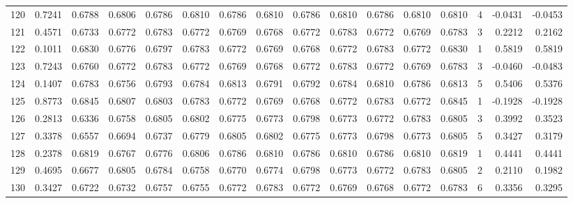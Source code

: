 \begin{tabular}{lrrrrrrrrrrrrrrr}
120 &      0.7241 &  0.6788 &  0.6806 &  0.6786 &  0.6810 &  0.6786 &  0.6810 &  0.6786 &  0.6810 &  0.6786 &   0.6810 &     0.6810 &      4 &                   -0.0431 &                    -0.0453 \\
121 &      0.4571 &  0.6733 &  0.6772 &  0.6783 &  0.6772 &  0.6769 &  0.6768 &  0.6772 &  0.6783 &  0.6772 &   0.6769 &     0.6783 &      3 &                    0.2212 &                     0.2162 \\
122 &      0.1011 &  0.6830 &  0.6776 &  0.6797 &  0.6783 &  0.6772 &  0.6769 &  0.6768 &  0.6772 &  0.6783 &   0.6772 &     0.6830 &      1 &                    0.5819 &                     0.5819 \\
123 &      0.7243 &  0.6760 &  0.6772 &  0.6783 &  0.6772 &  0.6769 &  0.6768 &  0.6772 &  0.6783 &  0.6772 &   0.6769 &     0.6783 &      3 &                   -0.0460 &                    -0.0483 \\
124 &      0.1407 &  0.6783 &  0.6756 &  0.6793 &  0.6784 &  0.6813 &  0.6791 &  0.6792 &  0.6784 &  0.6810 &   0.6786 &     0.6813 &      5 &                    0.5406 &                     0.5376 \\
125 &      0.8773 &  0.6845 &  0.6807 &  0.6803 &  0.6783 &  0.6772 &  0.6769 &  0.6768 &  0.6772 &  0.6783 &   0.6772 &     0.6845 &      1 &                   -0.1928 &                    -0.1928 \\
126 &      0.2813 &  0.6336 &  0.6758 &  0.6805 &  0.6802 &  0.6775 &  0.6773 &  0.6798 &  0.6773 &  0.6772 &   0.6783 &     0.6805 &      3 &                    0.3992 &                     0.3523 \\
127 &      0.3378 &  0.6557 &  0.6694 &  0.6737 &  0.6779 &  0.6805 &  0.6802 &  0.6775 &  0.6773 &  0.6798 &   0.6773 &     0.6805 &      5 &                    0.3427 &                     0.3179 \\
128 &      0.2378 &  0.6819 &  0.6767 &  0.6776 &  0.6806 &  0.6786 &  0.6810 &  0.6786 &  0.6810 &  0.6786 &   0.6810 &     0.6819 &      1 &                    0.4441 &                     0.4441 \\
129 &      0.4695 &  0.6677 &  0.6805 &  0.6784 &  0.6758 &  0.6770 &  0.6774 &  0.6798 &  0.6773 &  0.6772 &   0.6783 &     0.6805 &      2 &                    0.2110 &                     0.1982 \\
130 &      0.3427 &  0.6722 &  0.6732 &  0.6757 &  0.6755 &  0.6772 &  0.6783 &  0.6772 &  0.6769 &  0.6768 &   0.6772 &     0.6783 &      6 &                    0.3356 &                     0.3295 \\

\end{tabular}
